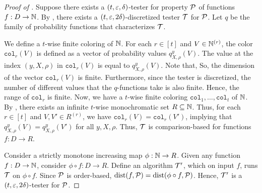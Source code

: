 \begin{proof}[Proof of ]
Suppose there exists a $(t,\varepsilon,\delta)$-tester for property $\mathcal{P}$ of functions $f:D \to \mathbb N$. By , there exists a $(t,\varepsilon,2\delta)$-discretized tester ${\cal T}$ for $\mathcal{P}$.  Let 
$q$ %
be the family of probability functions that characterizes ${\cal T}$.

We define a $t$-wise finite coloring of $\mathbb N$. For each $r \in [t]$ and $V \in \mathbb N^{(r)}$, the color $\texttt{col}_r(V)$ is defined as a vector of probability values $q_{X,\rho}^y(V)$. 
The value at the index $(y,X,\rho)$ in $\texttt{col}_r(V)$ is equal to $q_{X, \rho}^y (V)$.
Note that, 
So, the dimension of the vector $\texttt{col}_r(V)$ is finite. Furthermore, since the tester is discretized, the number of different values that the $q$-functions take is also finite. Hence, the range of $\texttt{col}_r$ is finite.
Now, we have a $t$-wise finite coloring $\texttt{col}_1, \ldots, \texttt{col}_t$ of $\mathbb N$. 
By , there exists an infinite $t$-wise monochromatic set $R \subseteq \mathbb N$.
Thus, for each $r \in [t]$ and $V, V' \in R^{(r)}$, we have $\texttt{col}_r(V) = \texttt{col}_r(V')$, implying that $q_{X,\rho}^y (V) = q_{X,\rho}^y (V')$ for all $y, X, \rho$. Thus, ${\cal T}$ is comparison-based for functions $f:D \to R$.

Consider a strictly monotone increasing map $\phi: \mathbb N \to R$. Given any function $f: D \to \mathbb N$, consider $\phi \circ f: D \to R$. 
Define an algorithm ${\cal T}'$, which on input $f$, runs ${\cal T}$ on $\phi \circ f$.
Since $\mathcal{P}$ is order-based, $\text{dist}(f, \mathcal{P}) = \text{dist}(\phi \circ f, \mathcal{P})$. 
Hence, ${\cal T}'$ is a $(t,\varepsilon, 2\delta)$-tester for $\mathcal{P}$.
\end{proof}


